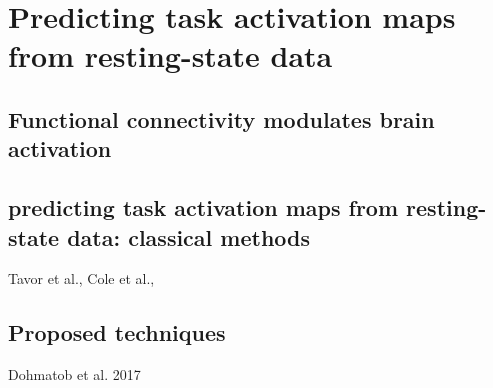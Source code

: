 








\chapter{Predicting task activation maps from resting-state data}\label{chapter1_activation_maps}

\section{Functional connectivity modulates brain activation}
\section{predicting task activation maps from resting-state data: classical methods}
Tavor et al., Cole et al.,
\section{Proposed techniques}
Dohmatob et al. 2017





